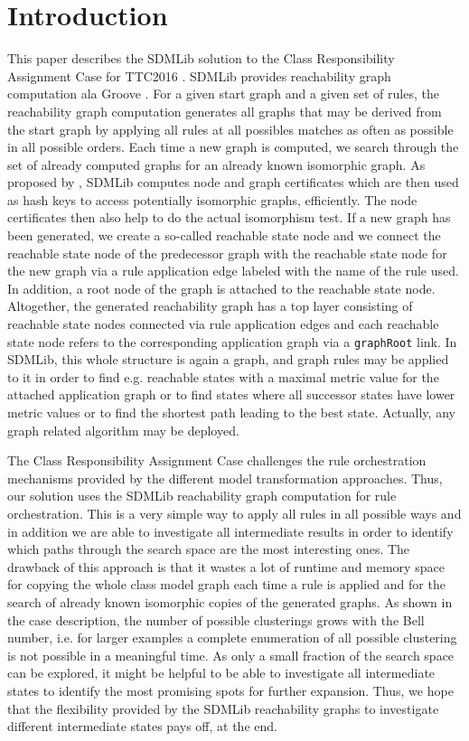 \documentclass[submission,copyright,creativecommons]{eptcs}
\begin{document}
\section{Introduction}
\label{sec:intro}

This paper describes the SDMLib solution to the Class Responsibility Assignment Case for TTC2016
\cite{ttc2016-case}. SDMLib provides reachability graph computation ala Groove 
\cite{rensink2003groove}. For a given start graph and a given set of rules, 
the reachability graph computation generates all graphs that may be derived from 
the start graph by applying all rules at all 
possibles matches as often as possible in all possible orders. Each time a new graph is 
computed, we search through the set of already computed graphs for an already known 
isomorphic graph. As proposed by \cite{rensink2003groove}, SDMLib computes node and graph 
certificates which are then used as hash keys to access potentially isomorphic graphs, 
efficiently. The node certificates then also help to do the actual isomorphism test. If a new 
graph has been generated, we create a so-called reachable state 
node and we connect the reachable state node of the predecessor graph with the reachable 
state node for the new graph via a rule application edge labeled with the name of 
the rule used. In addition, a root node of the graph is attached to the reachable state node. 
Altogether, the generated reachability graph has a top layer consisting of reachable 
state nodes connected via rule application edges and each reachable state node refers to 
the corresponding application graph via a \texttt{graphRoot} link. In SDMLib, this whole 
structure is again a graph, and graph rules may be applied to it in order to find e.g. 
reachable states with a maximal metric value for the attached application graph 
or to find states 
where all successor states have lower metric values or to find the shortest path leading to 
the best state. Actually, any graph related algorithm may be deployed.  

The Class Responsibility Assignment Case challenges the rule orchestration mechanisms 
provided by the different model transformation approaches. Thus, our solution uses the SDMLib 
reachability graph computation for rule orchestration. This is a very simple way to apply 
all rules in all possible ways and in addition we are able to investigate all intermediate 
results in order to identify which paths through the search space are the most interesting 
ones. The drawback of this approach is that it wastes a lot of runtime and memory space 
for copying the whole class model graph each time a rule is applied and for the search of 
already known isomorphic copies of the generated graphs. As shown in the case 
description, the number of possible clusterings grows with the Bell number, i.e. 
for larger examples a complete enumeration of all possible clustering is not possible in a 
meaningful time. As only a small fraction of the search space can be explored, it might be 
helpful to be able to investigate all intermediate states to identify the most promising spots 
for further expansion. Thus, we hope that the flexibility provided by the SDMLib reachability 
graphs to investigate different intermediate states pays off, at the end. 
\end{document}
